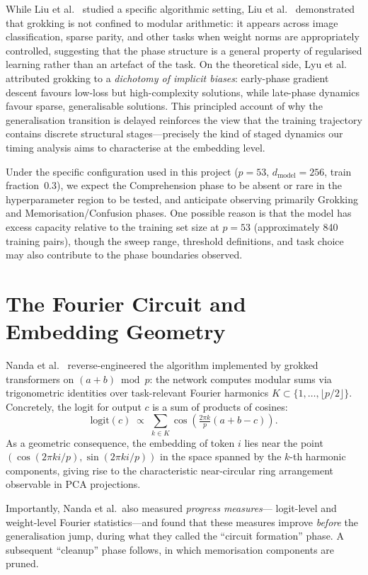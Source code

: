 \documentclass[12pt,openany,a4paper]{book}
\begin{document}
While Liu et al.\ \cite{liu2022towards} studied a specific algorithmic setting,
Liu et al.\ \cite{liu2023omnigrok} demonstrated that grokking is not
confined to modular arithmetic: it appears across image classification,
sparse parity, and other tasks when weight norms are appropriately
controlled, suggesting that the phase structure is a general property
of regularised learning rather than an artefact of the task.
On the theoretical side, Lyu et al.\ \cite{lyu2024dichotomy} attributed
grokking to a \emph{dichotomy of implicit biases}: early-phase gradient
descent favours low-loss but high-complexity solutions, while late-phase
dynamics favour sparse, generalisable solutions.
This principled account of why the generalisation transition is delayed
reinforces the view that the training trajectory contains discrete
structural stages---precisely the kind of staged dynamics our timing
analysis aims to characterise at the embedding level.

Under the specific configuration used in this project ($p=53$,
$d_{\mathrm{model}}=256$, train fraction~$0.3$), we expect
the Comprehension phase to be absent or rare in the hyperparameter
region to be tested, and anticipate observing primarily Grokking
and Memorisation/Confusion phases.
One possible reason is that the model has excess capacity relative
to the training set size at $p=53$ (approximately 840 training
pairs), though the sweep range, threshold definitions, and task
choice may also contribute to the phase boundaries observed.

\section{The Fourier Circuit and Embedding Geometry}

Nanda et al.\ \cite{nanda2023progress} reverse-engineered the
algorithm implemented by grokked transformers on $(a+b)\bmod p$:
the network computes modular sums via trigonometric identities
over task-relevant Fourier harmonics $K\subset\{1,\dots,\lfloor
p/2\rfloor\}$.
Concretely, the logit for output $c$ is a sum of products of cosines:
\[
  \mathrm{logit}(c) \;\propto\; \sum_{k\in K}
    \cos\!\left(\tfrac{2\pi k}{p}(a+b-c)\right).
\]
As a geometric consequence, the embedding of token $i$ lies near
the point $(\cos(2\pi ki/p),\sin(2\pi ki/p))$ in the space spanned
by the $k$-th harmonic components, giving rise to the characteristic
near-circular ring arrangement observable in PCA projections.

Importantly, Nanda et al.\ also measured \emph{progress measures}---
logit-level and weight-level Fourier statistics---and found that these
measures improve \emph{before} the generalisation jump, during what
they called the ``circuit formation'' phase.
A subsequent ``cleanup'' phase follows, in which memorisation
components are pruned.
\end{document}
